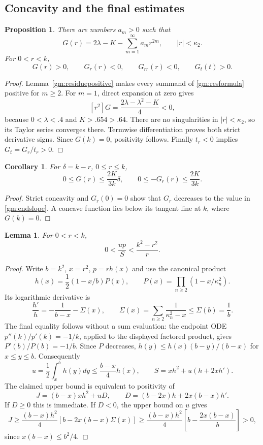 \documentclass[11pt,letterpaper,reqno]{amsart}
\newtheorem{lemma}[theorem]{Lemma}
\newtheorem{proposition}[theorem]{Proposition}
\newtheorem{corollary}[theorem]{Corollary}
\theoremstyle{definition}
\begin{document}
\subsection{Concavity and the final estimates}
\begin{proposition}
There are numbers $a_m>0$ such that
\[
 G(r)=2\lambda-K-\sum_{m=1}^\infty a_m r^{2m},
 \qquad |r|<\kappa_2.
\]
For $0<r<k$,
\[
 G(r)>0,\qquad G_r(r)<0,\qquad G_{rr}(r)<0,
 \qquad G_t(t)>0.
\]
\end{proposition}
\begin{proof}
Lemma~\ref{gm:residuepositive} makes every summand of
\eqref{gm:resformula} positive for $m\ge2$. For $m=1$, direct expansion
at zero gives
\[
 [r^2]G=\frac{2\lambda-\lambda^2-K}{4}<0,
\]
because $0<\lambda<.4$ and $K>.654>.64$.
There are no singularities in $|r|<\kappa_2$, so its Taylor series
converges there. Termwise differentiation proves both strict
derivative signs. Since $G(k)=0$, positivity follows. Finally
$t_r<0$ implies $G_t=G_r/t_r>0$.
\end{proof}

\begin{corollary}
For $\delta=k-r$, $0\le r\le k$,
\[
 0\le G(r)\le\frac{2K}{3k}\delta,\qquad
 0\le-G_r(r)\le\frac{2K}{3k}.
\]
\end{corollary}
\begin{proof}
Strict concavity and $G_r(0)=0$ show that $G_r$ decreases to the
value in \eqref{gm:endslope}. A concave function lies below its tangent
line at $k$, where $G(k)=0$.
\end{proof}

\begin{lemma}\label{gm:tailratio}
For $0<r<k$,
\[
 0<\frac{up}{S}<\frac{k^2-r^2}{r}.
\]
\end{lemma}
\begin{proof}
Write $b=k^2$, $x=r^2$, $p=rh(x)$ and use the canonical product
\[
 h(x)=\frac12(1-x/b)P(x),\qquad
 P(x)=\prod_{n\ge2}(1-x/\kappa_n^2).
\]
Its logarithmic derivative is
\[
 \frac{h'}h=-\frac1{b-x}-\Sigma(x),\qquad
 \Sigma(x)=\sum_{n\ge2}\frac1{\kappa_n^2-x}\le\Sigma(b)=\frac1b.
\]
The final equality follows without a sum evaluation: the endpoint ODE
$p''(k)/p'(k)=-1/k$, applied to the displayed factored product,
gives $P'(b)/P(b)=-1/b$.
Since $P$ decreases, $h(y)\le h(x)(b-y)/(b-x)$ for $x\le y\le b$.
Consequently
\[
 u=\frac12\int_x^bh(y)dy\le\frac{b-x}{4}h(x),\qquad
 S=xh^2+u(h+2xh').
\]
The claimed upper bound is equivalent to positivity of
\[
 J=(b-x)xh^2+uD,\qquad D=(b-2x)h+2x(b-x)h'.
\]
If $D\ge0$ this is immediate. If $D<0$, the upper bound on $u$
gives
\[
 J\ge\frac{(b-x)h^2}{4}
       [b-2x(b-x)\Sigma(x)]
 \ge\frac{(b-x)h^2}{4}
       \left[b-\frac{2x(b-x)}b\right]>0,
\]
since $x(b-x)\le b^2/4$.
\end{proof}
\end{document}
